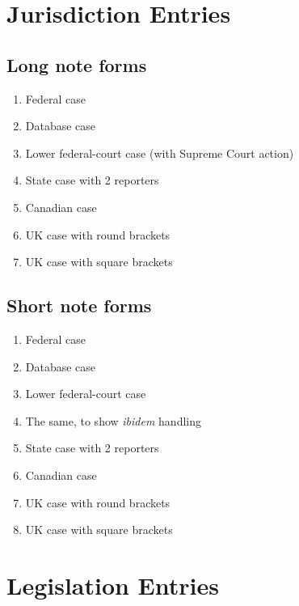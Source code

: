 \documentclass[a4paper,12pt]{article}
\begin{document}
\section*{Jurisdiction Entries}
\label{juris}

\subsection*{Long note forms}
\label{sec:long}
\begin{enumerate}\setlength{\parskip}{-4pt}
\item Federal case\autocite[145]{federal:case}
\item Database case\autocite{database:case}
\item Lower federal-court case (with Supreme Court
  action)\autocite{federal:lower:related}
\item State case with 2 reporters\autocite{state:case:2reps}
\item Canadian case\autocite{canada:case}
\item UK case with round brackets\autocite{uk:case:round}
\item UK case with square brackets\autocite{uk:case:square}
\end{enumerate}

\subsection*{Short note forms}
\label{sec:short}
\begin{enumerate}\setlength{\parskip}{-4pt}
\setcounter{enumi}{7}
\item Federal case\autocite[145]{federal:case}
\item Database case\autocite[3]{database:case}
\item Lower federal-court case\autocite[215]{federal:lower:related}
\item The same, to show \emph{ibidem}
  handling\autocite[212]{federal:lower:related}
\item State case with 2 reporters\autocite{state:case:2reps}
\item Canadian case\autocite{canada:case}
\item UK case with round brackets\autocite{uk:case:round}
\item UK case with square brackets\autocite{uk:case:square}
\end{enumerate}

\section*{Legislation Entries}
\label{legis}
\end{document}

